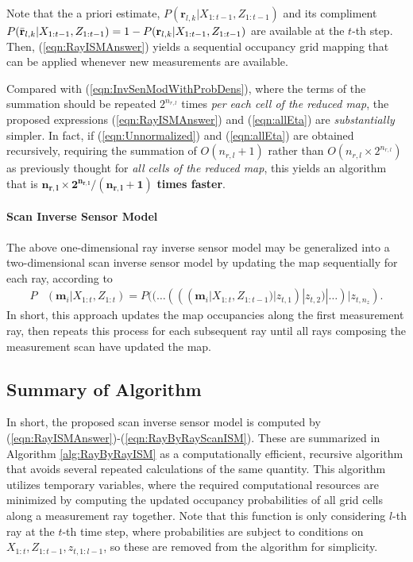 \documentclass[smallextended]{svjour3}       %
\newcommand{\refeqn}[1]{(\ref{eqn:#1})}
\begin{document}
Note that the a priori estimate, $P(\mathbf{r}_{l,k}|X_{1:t-1},Z_{1:t-1})$ and its compliment $\\P(\bar{\mathbf{r}}_{l,k}|X_{1:t-1},Z_{1:t-1})=1-P(\mathbf{r}_{l,k}|X_{1:t-1},Z_{1:t-1})$ are available at the $t$-th step. Then, \refeqn{RayISMAnswer} yields a sequential occupancy grid mapping that can be applied whenever new measurements are available. 

Compared with \refeqn{InvSenModWithProbDens}, where the terms of the summation should be repeated $2^{n_{r,l}}$ times \emph{per each cell of the reduced map}, the proposed expressions \refeqn{RayISMAnswer} and \refeqn{allEta} are \textit{substantially} simpler. In fact, if \refeqn{Unnormalized} and \refeqn{allEta} are obtained recursively, requiring the summation of $O(n_{r,l}+1)$ rather than $O(n_{r,l}\times2^{n_{r,l}})$ as previously thought for \emph{all cells of the reduced map}, this yields an algorithm that is $\mathbf{n_{r,l}\times2^{n_{r,l}}/(n_{r,l}+1)}$ \textbf{times faster}.


\paragraph{Scan Inverse Sensor Model}
The above one-dimensional ray inverse sensor model may be generalized into a two-dimensional scan inverse sensor model by updating the map sequentially for each ray, according to
\begin{align}
\label{eqn:RayByRayScanISM}
P&(\mathbf{m}_i|X_{1:t},Z_{1:t})%
=P((\dots(((\mathbf{m}_i|X_{1:t},Z_{1:t-1})|z_{t,1})|z_{t,2})|\ldots)|z_{t,n_z}).
\end{align}
In short, this approach updates the map occupancies along the first measurement ray, then repeats this process for each subsequent ray until all rays composing the measurement scan have updated the map.

\subsection{Summary of Algorithm}\label{sec:SA}

In short, the proposed scan inverse sensor model is computed by \refeqn{RayISMAnswer}-\refeqn{RayByRayScanISM}. These are summarized in Algorithm \ref{alg:RayByRayISM} as a computationally efficient, recursive algorithm that avoids several repeated calculations of the same quantity. This algorithm utilizes temporary variables, where the required computational resources are minimized by computing the updated occupancy probabilities of all grid cells along a measurement ray together. Note that this function is only considering $l$-th ray at the $t$-th time step, where probabilities are subject to conditions on $X_{1:t},Z_{1:t-1},z_{t,1:l-1}$, so these are removed from the algorithm for simplicity.
\end{document}
